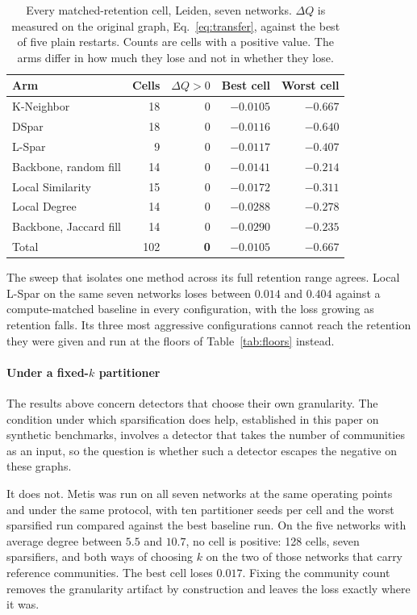 \begin{table}[t]
\centering
\caption{Every matched-retention cell, Leiden, seven networks. $\Delta Q$ is
measured on the original graph, Eq.~\eqref{eq:transfer}, against the best of five
plain restarts. Counts are cells with a positive value. The arms differ in how
much they lose and not in whether they lose.}
\label{tab:negative}
\small
\setlength{\tabcolsep}{4pt}
\begin{tabular}{@{}lrrrr@{}}
\toprule
Arm & Cells & $\Delta Q > 0$ & Best cell & Worst cell\\
\midrule
K-Neighbor            & 18 & 0 & $-0.0105$ & $-0.667$\\
DSpar                 & 18 & 0 & $-0.0116$ & $-0.640$\\
L-Spar                &  9 & 0 & $-0.0117$ & $-0.407$\\
Backbone, random fill & 14 & 0 & $-0.0141$ & $-0.214$\\
Local Similarity      & 15 & 0 & $-0.0172$ & $-0.311$\\
Local Degree          & 14 & 0 & $-0.0288$ & $-0.278$\\
Backbone, Jaccard fill& 14 & 0 & $-0.0290$ & $-0.235$\\
\midrule
Total                 & 102 & \textbf{0} & $-0.0105$ & $-0.667$\\
\bottomrule
\end{tabular}
\end{table}

The sweep that isolates one method across its full retention range agrees. Local
L-Spar on the same seven networks loses between $0.014$ and
$0.404$ against a compute-matched baseline in every configuration, with
the loss growing as retention falls. Its three most aggressive configurations
cannot reach the retention they were given and run at the floors of
Table~\ref{tab:floors} instead.

\paragraph{Under a fixed-$k$ partitioner}
The results above concern
detectors that choose their own granularity. The condition under which
sparsification does help, established in this paper on synthetic benchmarks,
involves a detector that takes the number of communities as an input, so the
question is whether such a detector escapes the negative on these graphs.

It does not. Metis was run on all seven networks at the same operating points and
under the same protocol, with ten partitioner seeds per cell and the worst
sparsified run compared against the best baseline run. On the five networks with
average degree between $5.5$ and $10.7$, no cell is positive: 128 cells, seven
sparsifiers, and both ways of choosing $k$ on the two of those networks that
carry reference communities. The best cell loses $0.017$. Fixing
the community count removes the granularity artifact by construction and leaves
the loss exactly where it was.

